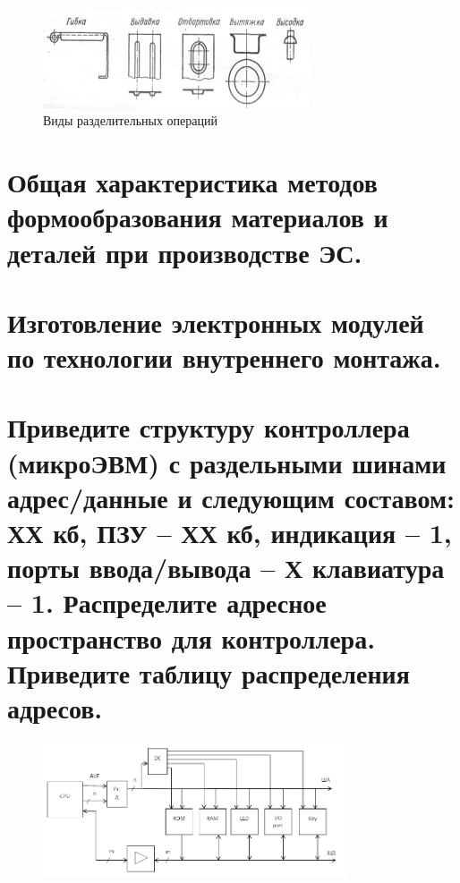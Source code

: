 \documentclass[unicode, 12pt, a4paper, oneside]{article}
\begin{document}
\begin{figure}[htbp]
\centering
\includegraphics[width=0.7\textwidth]{98_operations2.png}
\caption{Виды разделительных операций}
\label{fig:98_operations2}
\end{figure}

\section{Общая характеристика методов формообразования материалов и деталей при производстве ЭС.}


\section{Изготовление электронных модулей по технологии внутреннего монтажа.}


\section{Приведите структуру контроллера (микроЭВМ) с раздельными шинами адрес/данные и следующим составом: ХХ кб, ПЗУ – ХХ кб, индикация – 1, порты ввода/вывода – Х клавиатура – 1. Распределите адресное пространство для контроллера. Приведите таблицу распределения адресов.}

\begin{figure}[H]
\centering
\includegraphics[width=0.8\textwidth]{101_struct.png}
\end{figure}
\end{document}
